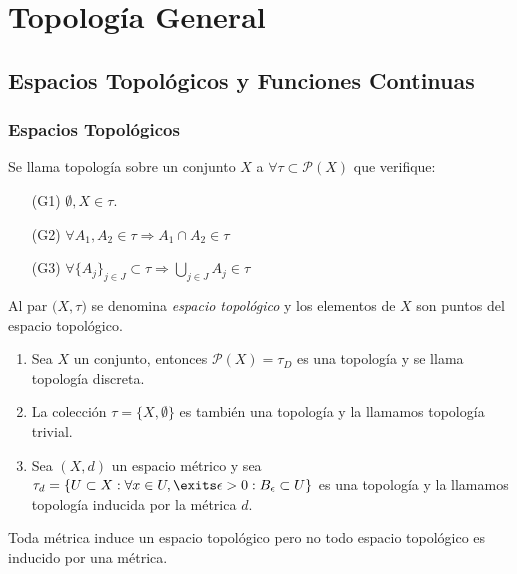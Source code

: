 \part{Topología General}
\chapter{Espacios Topológicos y Funciones Continuas}
\section{Espacios Topológicos}

\begin{defn}[Topología]
  Se llama topología sobre un conjunto $X$ a $\forall \tau \subset \mathcal{P}(X)$ que verifique:
  \begin{enumerate}[label=(\roman*)]
    \item [(G1)] $\emptyset,X \in \tau$.
    \item [(G2)] $\forall A_{1}, A_{2} \in \tau \Rightarrow A_{1}\cap A_{2} \in \tau$
    \item [(G3)] $\forall \{ A_{j} \}_{j \in J} \subset \tau \Rightarrow \bigcup_{j \in J} A_{j} \in \tau$
  \end{enumerate}
\end{defn}

\begin{obs}
  Al par $\big( X, \tau \big)$ se denomina \textit{espacio topológico} y los elementos de $X$ son puntos del espacio topológico.
\end{obs}

\begin{ejm}
  \begin{enumerate}[label=(\roman*)]
    \item   Sea $X$ un conjunto, entonces $\mathcal{P}(X) = \tau_{D}$ es una topología y se llama topología discreta.
    \item  La colección $\tau = \{ X, \emptyset \}$ es también una topología y la llamamos topología trivial.
    \item Sea $(X, d)$ un espacio métrico y sea $\tau_{d} = \{ U \subset X : \forall x \in U, \exits \epsilon > 0 : B_{\epsilon} \subset U \}$ es una topología y la llamamos topología inducida por la métrica $d$.
  \end{enumerate}
\end{ejm}

\begin{obs}
  Toda métrica induce un espacio topológico pero no todo espacio topológico es inducido por una métrica.
\end{obs}

